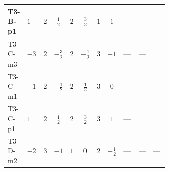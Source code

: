 \documentclass[8pt]{article}
\begin{document}
\begin{landscape}
\begin{longtable}{@{}llcccccc >{\raggedright\arraybackslash}p{0.21\linewidth} >{\raggedright\arraybackslash}p{0.21\linewidth} >{\raggedright\arraybackslash}p{0.21\linewidth}@{}}
\midrule
T3-B-p1 & $1$ & $2$ & $\frac{1}{2}$ & $2$ & $\frac{3}{2}$ & $1$ & $1$ & --- & \scriptsize\adjustbox{max width=\linewidth}{$\begin{gathered} +{g_1}^2 \left(6 {g_2}^2-3 {\lambda_{HS_1}^{(A)}}\right)\end{gathered}$} & --- \\
\midrule
T3-C-m3 & $-3$ & $2$ & $-\frac{3}{2}$ & $2$ & $-\frac{1}{2}$ & $3$ & $-1$ & --- & --- & \scriptsize\adjustbox{max width=\linewidth}{$\begin{gathered} {\lambda_{HS_1}^{(A)}} (3 T_{\nu}^{(1)}+6 \operatorname{Tr}\!\left({Y_d}\,\left({Y_d}\right)^{\dagger}\right)+2 \operatorname{Tr}\!\left({Y_e}\,\left({Y_e}\right)^{\dagger}\right)+6 \operatorname{Tr}\!\left({Y_u}\,\left({Y_u}\right)^{\dagger}\right))\end{gathered}$} \\
\midrule
T3-C-m1 & $-1$ & $2$ & $-\frac{1}{2}$ & $2$ & $\frac{1}{2}$ & $3$ & $0$ & \scriptsize\adjustbox{max width=\linewidth}{$\begin{gathered} -\frac{4}{3} {\lambda_{11}} \left({\lambda_{H H^\dagger S_1^\dagger S_2^\dagger}^{\rm Cross}}\right)^{*}\end{gathered}$} & --- & \scriptsize\adjustbox{max width=\linewidth}{$\begin{gathered} {\lambda_{HS_1}^{(A)}} (3 T_{\nu}^{(1)}+6 \operatorname{Tr}\!\left({Y_d}\,\left({Y_d}\right)^{\dagger}\right)+2 \operatorname{Tr}\!\left({Y_e}\,\left({Y_e}\right)^{\dagger}\right)+6 \operatorname{Tr}\!\left({Y_u}\,\left({Y_u}\right)^{\dagger}\right))\end{gathered}$} \\
\midrule
T3-C-p1 & $1$ & $2$ & $\frac{1}{2}$ & $2$ & $\frac{3}{2}$ & $3$ & $1$ & --- & \scriptsize\adjustbox{max width=\linewidth}{$\begin{gathered} +{g_1}^2 \left(6 {g_2}^2-3 {\lambda_{HS_1}^{(A)}}\right)\end{gathered}$} & \scriptsize\adjustbox{max width=\linewidth}{$\begin{gathered} {\lambda_{HS_1}^{(A)}} (3 T_{\nu}^{(1)}+6 \operatorname{Tr}\!\left({Y_d}\,\left({Y_d}\right)^{\dagger}\right)+2 \operatorname{Tr}\!\left({Y_e}\,\left({Y_e}\right)^{\dagger}\right)+6 \operatorname{Tr}\!\left({Y_u}\,\left({Y_u}\right)^{\dagger}\right))\end{gathered}$} \\
\midrule
T3-D-m2 & $-2$ & $3$ & $-1$ & $1$ & $0$ & $2$ & $-\frac{1}{2}$ & --- & --- & --- \\
\midrule

\end{longtable}
\end{landscape}
\end{document}
